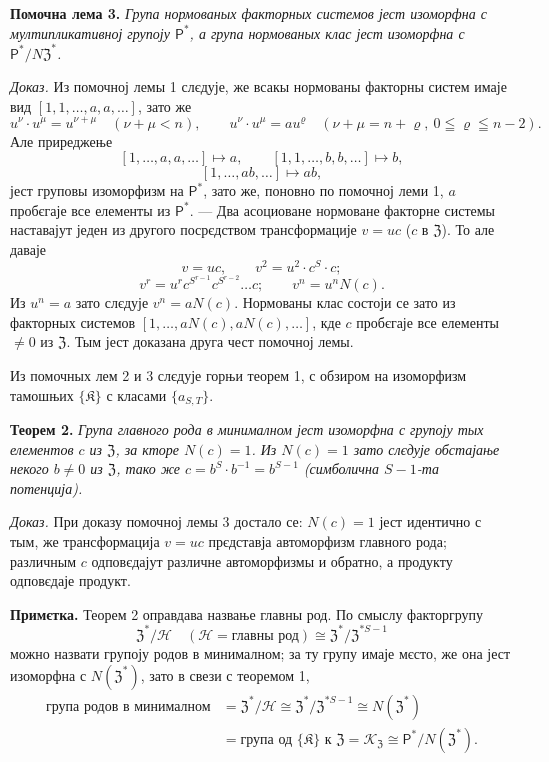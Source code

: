 \documentclass[11pt]{article}
\begin{document}
\noindent\textbf{Помочна лема 3.} \emph{Група нормованых факторных системов јест изоморфна с мултипликативној групоју \(\mathsf{P}^*\), а група нормованых клас јест изоморфна с \(\mathsf{P}^*/N\mathfrak Z^*\).}

\noindent\emph{Доказ.} Из помочној лемы 1 слєдује, же всакы нормованы факторны систем имаје вид \([1,1,\ldots,a,a,\ldots]\), зато же
\[
u^\nu\cdot u^\mu=u^{\nu+\mu}\quad(\nu+\mu<n),
\qquad
u^\nu\cdot u^\mu=au^\varrho\quad(\nu+\mu=n+\varrho,\ 0\leqq\varrho\leqq n-2).
\]
Але приреджење
\[
[1,\ldots,a,a,\ldots]\mapsto a,
\qquad
[1,1,\ldots,b,b,\ldots]\mapsto b,
\]
\[
[1,\ldots,ab,\ldots]\mapsto ab,
\]
јест груповы изоморфизм на \(\mathsf{P}^*\), зато же, поновно по помочној леми 1, \(a\) пробєгаје все елементы из \(\mathsf{P}^*\). --- Два асоциоване нормоване факторне системы наставајут једен из другого посрєдством трансформације \(v=uc\) (\(c\) в \(\mathfrak Z\)). То але даваје
\[
v=uc,\qquad v^2=u^2\cdot c^S\cdot c;
\]
\[
v^r=u^r c^{S^{r-1}}c^{S^{r-2}}\ldots c;
\qquad
v^n=u^nN(c).
\]
Из \(u^n=a\) зато слєдује \(v^n=aN(c)\). Нормованы клас состоји се зато из факторных системов \([1,\ldots,aN(c),aN(c),\ldots]\), кде \(c\) пробєгаје все елементы \(\neq0\) из \(\mathfrak Z\). Тым јест доказана друга чест помочној лемы.

Из помочных лем 2 и 3 слєдује горњи теорем 1, с обзиром на изоморфизм тамошњих \(\{\mathfrak K\}\) с класами \(\{a_{S,T}\}\).

\noindent\textbf{Теорем 2.} \emph{Група главного рода в минималном јест изоморфна с групоју тых елементов \(c\) из \(\mathfrak Z\), за кторе \(N(c)=1\). Из \(N(c)=1\) зато слєдује обстајање некого \(b\neq0\) из \(\mathfrak Z\), тако же \(c=b^S\cdot b^{-1}=b^{S-1}\) (симболична \(S-1\)-та потенција).}

\noindent\emph{Доказ.} При доказу помочној лемы 3 достало се: \(N(c)=1\) јест идентично с тым, же трансформација \(v=uc\) прєдставја автоморфизм главного рода; различным \(c\) одповєдајут различне автоморфизмы и обратно, а продукту одповєдаје продукт.

\noindent\textbf{Примєтка.} Теорем 2 оправдава назвање главны род. По смыслу факторгрупу
\[
\mathfrak Z^*/\mathscr H
\quad(\mathscr H=\text{главны род})
\cong\mathfrak Z^*/\mathfrak Z^{*S-1}
\]
можно назвати групоју родов в минималном; за ту групу имаје мєсто, же она јест изоморфна с \(N(\mathfrak Z^*)\), зато в свези с теоремом 1,
\[
\begin{aligned}
\text{група родов в минималном}
&=\mathfrak Z^*/\mathscr H
 \cong\mathfrak Z^*/\mathfrak Z^{*S-1}
 \cong N(\mathfrak Z^*)\\
&=\text{група од }\{\mathfrak K\}\text{ к }\mathfrak Z
 =\mathscr K_{\mathfrak Z}
 \cong \mathsf{P}^*/N(\mathfrak Z^*).
\end{aligned}
\]
\end{document}
